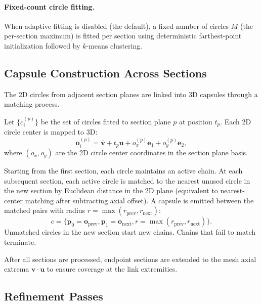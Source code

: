 \paragraph{Fixed-count circle fitting.}
When adaptive fitting is disabled (the default), a fixed number of circles $M$ (the per-section maximum) is fitted per section using deterministic farthest-point initialization followed by $k$-means clustering.

\subsection{Capsule Construction Across Sections}

The 2D circles from adjacent section planes are linked into 3D capsules through a matching process.

Let $\{c_{i}^{(p)}\}$ be the set of circles fitted to section plane $p$ at position $t_p$.
Each 2D circle center is mapped to 3D:
\begin{equation}
\mathbf{o}_{i}^{(p)} = \bar{\mathbf{v}} + t_p \mathbf{u} + o_x^{(p)} \mathbf{e}_1 + o_y^{(p)} \mathbf{e}_2,
\end{equation}
where $(o_x, o_y)$ are the 2D circle center coordinates in the section plane basis.

Starting from the first section, each circle maintains an active chain.
At each subsequent section, each active circle is matched to the nearest unused circle in the new section by Euclidean distance in the 2D plane (equivalent to nearest-center matching after subtracting axial offset).
A capsule is emitted between the matched pairs with radius $r = \max(r_{\text{prev}}, r_{\text{next}})$:
\begin{equation}
c = \{ \mathbf{p}_0 = \mathbf{o}_{\text{prev}}, \mathbf{p}_1 = \mathbf{o}_{\text{next}}, r = \max(r_{\text{prev}}, r_{\text{next}}) \}.
\end{equation}
Unmatched circles in the new section start new chains.
Chains that fail to match terminate.

After all sections are processed, endpoint sections are extended to the mesh axial extrema $\mathbf{v} \cdot \mathbf{u}$ to ensure coverage at the link extremities.

\subsection{Refinement Passes}

